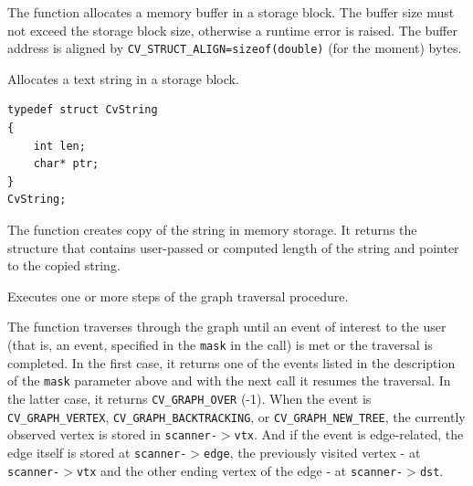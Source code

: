 \begin{description}
\end{description}

The function allocates a memory buffer in
a storage block. The buffer size must not exceed the storage block size,
otherwise a runtime error is raised. The buffer address is aligned by
\texttt{CV\_STRUCT\_ALIGN=sizeof(double)} (for the moment) bytes.

Allocates a text string in a storage block.


\begin{lstlisting}
typedef struct CvString
{
    int len;
    char* ptr;
}
CvString;
\end{lstlisting}

\begin{description}
\end{description}

The function creates copy of the string
in memory storage. It returns the structure that contains user-passed
or computed length of the string and pointer to the copied string.

Executes one or more steps of the graph traversal procedure.


\begin{description}
\end{description}

The function traverses through the graph
until an event of interest to the user (that is, an event, specified
in the \texttt{mask} in the  call) is met or the
traversal is completed. In the first case, it returns one of the events
listed in the description of the \texttt{mask} parameter above and with
the next call it resumes the traversal. In the latter case, it returns
\texttt{CV\_GRAPH\_OVER} (-1). When the event is \texttt{CV\_GRAPH\_VERTEX},
\texttt{CV\_GRAPH\_BACKTRACKING}, or \texttt{CV\_GRAPH\_NEW\_TREE},
the currently observed vertex is stored in \texttt{scanner-$>$vtx}. And if the
event is edge-related, the edge itself is stored at \texttt{scanner-$>$edge},
the previously visited vertex - at \texttt{scanner-$>$vtx} and the other ending
vertex of the edge - at \texttt{scanner-$>$dst}.

